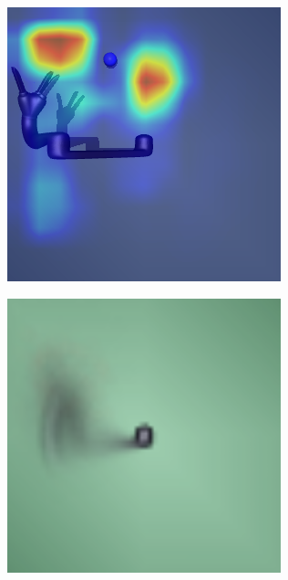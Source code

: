 \begin{figure}[h!]
  \centering
  \begin{subfigure}{0.24\columnwidth}
    \includegraphics[width=\linewidth]{figures/chapter6/occ_jaco_baseline}
  \end{subfigure}
  \begin{subfigure}{0.24\columnwidth}
    \includegraphics[width=\linewidth]{figures/chapter6/average_map_jaco_large.png}

\end{subfigure}
\end{figure}
